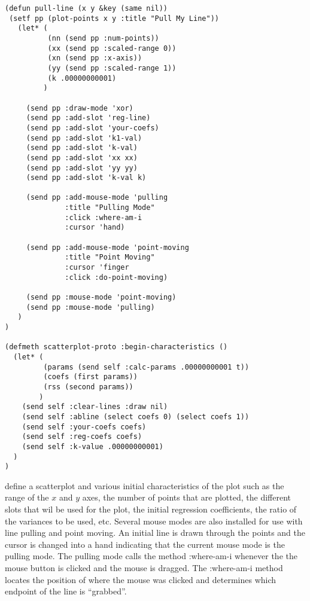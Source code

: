\documentclass[11pt]{report}
\begin{document}
\begin{verbatim}  
(defun pull-line (x y &key (same nil))
 (setf pp (plot-points x y :title "Pull My Line"))
   (let* (
          (nn (send pp :num-points))
          (xx (send pp :scaled-range 0))
          (xn (send pp :x-axis))
          (yy (send pp :scaled-range 1))
          (k .00000000001)
         )

     (send pp :draw-mode 'xor)
     (send pp :add-slot 'reg-line)
     (send pp :add-slot 'your-coefs)
     (send pp :add-slot 'k1-val)
     (send pp :add-slot 'k-val)
     (send pp :add-slot 'xx xx)
     (send pp :add-slot 'yy yy)
     (send pp :add-slot 'k-val k)

     (send pp :add-mouse-mode 'pulling 
              :title "Pulling Mode" 
              :click :where-am-i 
              :cursor 'hand)

     (send pp :add-mouse-mode 'point-moving
              :title "Point Moving"
              :cursor 'finger
              :click :do-point-moving)

     (send pp :mouse-mode 'point-moving)
     (send pp :mouse-mode 'pulling)
   )
)

(defmeth scatterplot-proto :begin-characteristics ()
  (let* (
         (params (send self :calc-params .00000000001 t))
         (coefs (first params))
         (rss (second params))
        )
    (send self :clear-lines :draw nil)
    (send self :abline (select coefs 0) (select coefs 1))
    (send self :your-coefs coefs)
    (send self :reg-coefs coefs)
    (send self :k-value .00000000001)
  )
)

\end{verbatim}
define a scatterplot and various initial characteristics of the plot such as 
the range of the $x$ and $y$ axes, the number of points that are plotted,
the different slots that wil be used for the plot,
the initial regression coefficients, the ratio of the
variances to be used, etc.  Several mouse modes are also installed
for use with line pulling and point moving.  An initial line is drawn through 
the points and the cursor is changed into
a hand indicating that the current mouse mode is the pulling mode.  
 The pulling mode calls
the method :where-am-i whenever the the mouse button is clicked and the mouse
is dragged.  The :where-am-i method locates the position of where the mouse
was clicked and determines which endpoint of the line is ``grabbed''.  
\end{document}
